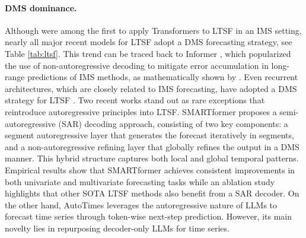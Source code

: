 \documentclass[a4paper,oneside,bibliography=totoc]{scrbook}
\begin{document}
\paragraph{DMS dominance.}
Although \citet{li_enhancing_2019} were among the first to apply Transformers to LTSF in an IMS setting, nearly all major recent models for LTSF adopt a DMS forecasting strategy, see Table \ref{tab:ltsf}. This trend can be traced back to Informer \cite{zhou_informer_2021}, which popularized the use of non-autoregressive decoding to mitigate error accumulation in long-range predictions of IMS methods, as mathematically shown by \citet{sun_fredo_2022}.
Even recurrent architectures, which are closely related to IMS forecasting, have adopted a DMS strategy for LTSF \cite{lin_segrnn_2023, jia_witran_2023}.
Two recent works stand out as rare exceptions that reintroduce autoregressive principles into LTSF.
SMARTformer \cite{li_smartformer_2023} proposes a semi-autoregressive (SAR) decoding approach, consisting of two key components: a segment autoregressive layer that generates the forecast iteratively in segments, and a non-autoregressive refining layer that globally refines the output in a DMS manner. 
This hybrid structure captures both local and global temporal patterns. Empirical results show that SMARTformer achieves consistent improvements in both univariate and multivariate forecasting tasks while an ablation study highlights that other SOTA LTSF methods also benefit from a SAR decoder.
On the other hand, AutoTimes \cite{liu_autotimes_2024} leverages the autoregressive nature of LLMs to forecast time series through token-wise next-step prediction. However, its main novelty lies in repurposing decoder-only LLMs for time series.%
\end{document}
